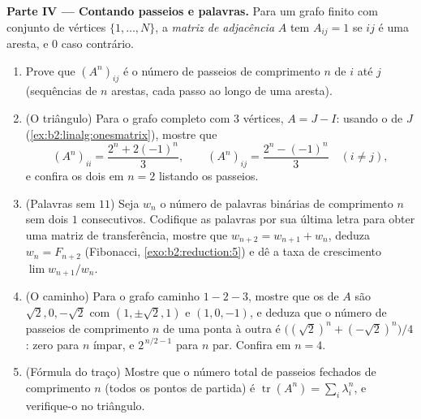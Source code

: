 \begin{problem}
\medskip
\noindent\textbf{Parte IV --- Contando passeios e palavras.} Para um
grafo finito com conjunto de vértices $\{1, \dots, N\}$, a
\emph{matriz de adjacência} $A$ tem $A_{ij} = 1$ se $ij$ é uma aresta,
e $0$ caso contrário.
\begin{enumerate}[resume]
  \item Prove que $(A^n)_{ij}$ é o número de passeios de comprimento
        $n$ de $i$ até $j$ (sequências de $n$ arestas, cada passo
        ao longo de uma aresta).
  \item (O triângulo) Para o grafo completo com $3$ vértices,
        $A = J - I$: usando o  de $J$
        (\cref{ex:b2:linalg:onesmatrix}), mostre que
        \[
        (A^n)_{ii} = \frac{2^n + 2(-1)^n}{3},
        \qquad
        (A^n)_{ij} = \frac{2^n - (-1)^n}{3} \quad (i \neq j),
        \]
        e confira os dois em $n = 2$ listando os passeios.
  \item (Palavras sem $11$) Seja $w_n$ o número de palavras
        binárias de comprimento $n$ sem dois $1$ consecutivos.
        Codifique as palavras por sua última letra para obter uma matriz de
        transferência, mostre que $w_{n+2} = w_{n+1} + w_n$, deduza $w_n =
        F_{n+2}$ (Fibonacci, \cref{exo:b2:reduction:5}) e
        dê a taxa de crescimento $\lim w_{n+1}/w_n$.
  \item (O caminho) Para o grafo caminho $1 - 2 - 3$, mostre que os
         de $A$ são $\sqrt2, 0, -\sqrt2$ com
         $(1, \pm\sqrt2, 1)$ e $(1, 0, -1)$, e
        deduza que o número de passeios de comprimento $n$ de uma ponta
        à outra é $\bigl((\sqrt2)^n + (-\sqrt2)^n\bigr)/4$:
        zero para $n$ ímpar, e $2^{\,n/2 - 1}$ para $n$ par.
        Confira em $n = 4$.
  \item (Fórmula do traço) Mostre que o número total de passeios
        fechados de comprimento $n$ (todos os pontos de partida) é
        $\operatorname{tr}(A^n) = \sum_i \lambda_i^n$, e
        verifique-o no triângulo.
\end{enumerate}


\end{problem}
